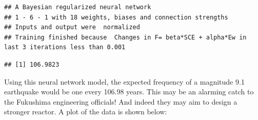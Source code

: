 \begin{verbatim}
## A Bayesian regularized neural network 
## 1 - 6 - 1 with 18 weights, biases and connection strengths
## Inputs and output were  normalized
## Training finished because  Changes in F= beta*SCE + alpha*Ew in last 3 iterations less than 0.001
\end{verbatim}

\begin{Shaded}
\begin{Highlighting}[]
\OtherTok{\textless{}{-}}  \NormalTok{(} \NormalTok{)) }
\SpecialCharTok{/}\NormalTok{(}\SpecialCharTok{\^{}}
\end{Highlighting}
\end{Shaded}

\begin{verbatim}
## [1] 106.9823
\end{verbatim}

Using this neural network model, the expected frequency of a magnitude
9.1 earthquake would be one every 106.98 years.  This may be an alarming catch to the Fukushima engineering officials!  And indeed they may aim to design a stronger reactor. A plot of the data is shown below:

